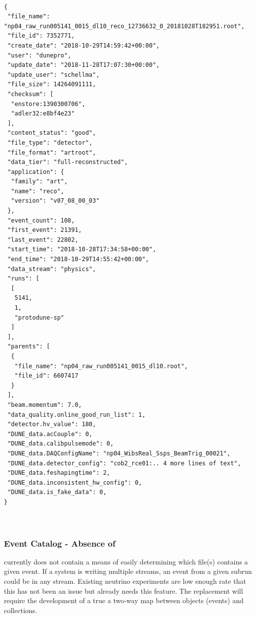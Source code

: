 \documentclass[../main-v1.tex]{subfiles}
\begin{document}
\begin{verbatim}

{
 "file_name": "np04_raw_run005141_0015_dl10_reco_12736632_0_20181028T182951.root", 
 "file_id": 7352771, 
 "create_date": "2018-10-29T14:59:42+00:00", 
 "user": "dunepro", 
 "update_date": "2018-11-28T17:07:30+00:00", 
 "update_user": "schellma", 
 "file_size": 14264091111, 
 "checksum": [
  "enstore:1390300706", 
  "adler32:e8bf4e23"
 ], 
 "content_status": "good", 
 "file_type": "detector", 
 "file_format": "artroot", 
 "data_tier": "full-reconstructed", 
 "application": {
  "family": "art", 
  "name": "reco", 
  "version": "v07_08_00_03"
 }, 
 "event_count": 108, 
 "first_event": 21391, 
 "last_event": 22802, 
 "start_time": "2018-10-28T17:34:58+00:00", 
 "end_time": "2018-10-29T14:55:42+00:00", 
 "data_stream": "physics", 
 "runs": [
  [
   5141, 
   1, 
   "protodune-sp"
  ]
 ], 
 "parents": [
  {
   "file_name": "np04_raw_run005141_0015_dl10.root", 
   "file_id": 6607417
  }
 ],
 "beam.momentum": 7.0, 
 "data_quality.online_good_run_list": 1, 
 "detector.hv_value": 180, 
 "DUNE_data.acCouple": 0, 
 "DUNE_data.calibpulsemode": 0, 
 "DUNE_data.DAQConfigName": "np04_WibsReal_Ssps_BeamTrig_00021", 
 "DUNE_data.detector_config": "cob2_rce01:.. 4 more lines of text", 
 "DUNE_data.feshapingtime": 2, 
 "DUNE_data.inconsistent_hw_config": 0, 
 "DUNE_data.is_fake_data": 0, 
}



\end{verbatim}



\subsubsection{Event Catalog - Absence of}
 currently does not contain a means of easily determining which file(s) contains a given event.  If a  system is writing multiple streams, an event from a given subrun could be in any stream.   Existing neutrino experiments are low enough rate that this has not been an issue but  already needs this feature.
The  replacement will require the development of a true a two-way map between objects (events) and collections. 

 
\end{document}
